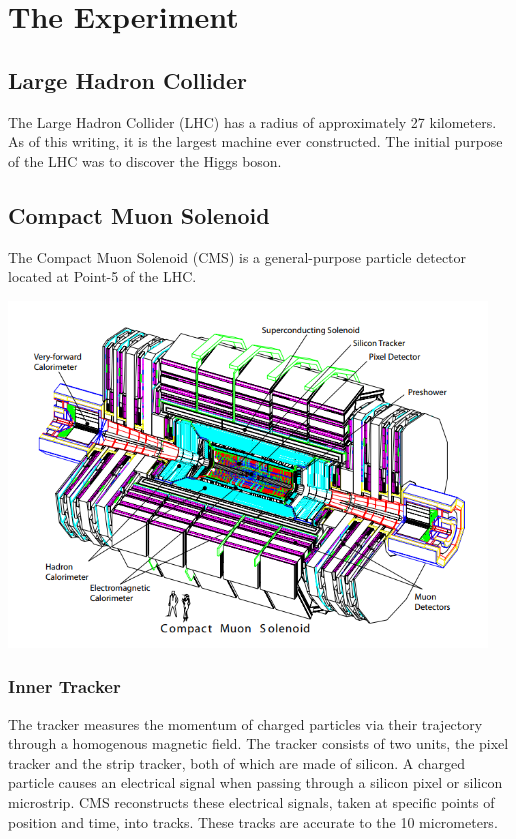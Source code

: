 
\chapter{The Experiment}

\section{Large Hadron Collider}

The Large Hadron Collider (LHC) has a radius of approximately 27 kilometers. As of this writing, it is the largest machine ever constructed. The initial purpose of the LHC was to discover the Higgs boson.

\section{Compact Muon Solenoid}

The Compact Muon Solenoid (CMS) is a general-purpose particle detector located at Point-5 of the LHC. 

\centerline{
\includegraphics[width=5in]{Chapter3/importfigs/fromCMS_DesignPaper_perspective.png}
}

\subsection{Inner Tracker}

The tracker measures the momentum of charged particles via their trajectory through a homogenous magnetic field. The tracker consists of two units, the pixel tracker and the strip tracker, both of which are made of silicon. A charged particle causes an electrical signal when passing through a silicon pixel or silicon microstrip. CMS reconstructs these electrical signals, taken at specific points of position and time, into tracks. These tracks are accurate to the 10 micrometers. 

